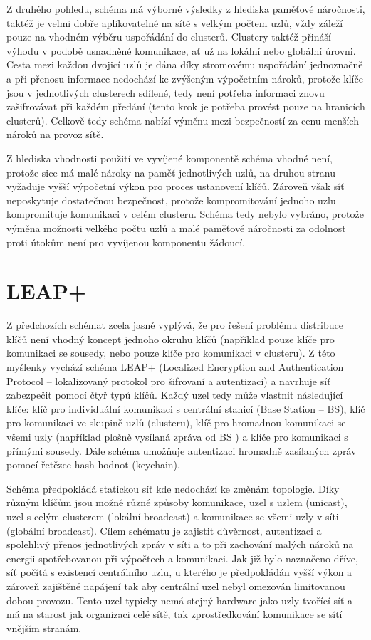 \documentclass[11pt,final,twoside]{fithesis2}
\begin{document}
Z druhého pohledu, schéma má výborné výsledky z hlediska paměťové náročnosti, taktéž je velmi dobře aplikovatelné na sítě s velkým
počtem uzlů, vždy záleží pouze na vhodném výběru uspořádání do clusterů. Clustery taktéž přináší výhodu v podobě usnadněné komunikace, ať 
už na lokální nebo globální úrovni. Cesta mezi každou dvojicí uzlů je dána díky stromovému uspořádání jednoznačně a při přenosu informace 
nedochází ke zvýšeným výpočetním nároků, protože klíče jsou v jednotlivých clusterech sdílené, tedy není potřeba informaci znovu 
zašifrovávat při každém předání (tento krok je potřeba provést pouze na hranicích clusterů). Celkově tedy schéma nabízí výměnu mezi 
bezpečností za cenu menších nároků na provoz sítě. 

Z hlediska vhodnosti použití ve vyvíjené komponentě schéma vhodné není, protože sice má malé nároky na paměť jednotlivých uzlů, na druhou 
stranu vyžaduje vyšší výpočetní výkon pro proces ustanovení klíčů. Zároveň však síť neposkytuje dostatečnou bezpečnost, protože 
kompromitování jednoho uzlu kompromituje komunikaci v celém clusteru. Schéma tedy nebylo vybráno, protože výměna možnosti velkého počtu
uzlů a malé paměťové náročnosti za odolnost proti útokům není pro vyvíjenou komponentu žádoucí. 

\section{LEAP+} \label{sec:leap}
Z předchozích schémat zcela jasně vyplývá, že pro řešení problému distribuce klíčů není vhodný koncept jednoho okruhu klíčů (například pouze klíče pro komunikaci se sousedy, nebo pouze
klíče pro komunikaci v clusteru). Z této myšlenky vychází schéma LEAP+ \cite{Zhu2006} (Localized Encryption and Authentication Protocol -- lokalizovaný protokol pro šifrovaní a autentizaci) 
a navrhuje síť zabezpečit pomocí čtyř typů klíčů. Každý uzel tedy může vlastnit následující klíče: klíč pro individuální komunikaci s centrální stanicí (Base Station -- BS), klíč pro komunikaci 
ve skupině uzlů (clusteru), klíč pro hromadnou komunikaci se všemi uzly (například plošně vysílaná zpráva od BS ) a klíče pro komunikaci s přímými sousedy. Dále schéma umožňuje autentizaci hromadně 
zasílaných zpráv pomocí řetězce hash hodnot (keychain). 

Schéma předpokládá statickou síť kde nedochází ke změnám topologie. Díky různým klíčům jsou možné různé způsoby komunikace, uzel s uzlem (unicast), uzel s celým clusterem (lokální broadcast) 
a komunikace se všemi uzly v síti (globální broadcast). Cílem schématu je zajistit důvěrnost, autentizaci a spolehlivý přenos jednotlivých zpráv v síti a to při zachování malých nároků
na energii spotřebovanou při výpočtech a komunikaci. Jak již bylo naznačeno dříve, síť počítá s existencí centrálního uzlu, u kterého je předpokládán vyšší výkon a zároveň zajištěné napájení tak 
aby centrální uzel nebyl omezován limitovanou dobou provozu. Tento uzel typicky nemá stejný hardware jako uzly tvořící síť a má na starost jak organizaci celé sítě, tak zprostředkování komunikace se 
sítí vnějším stranám.  
\end{document}
